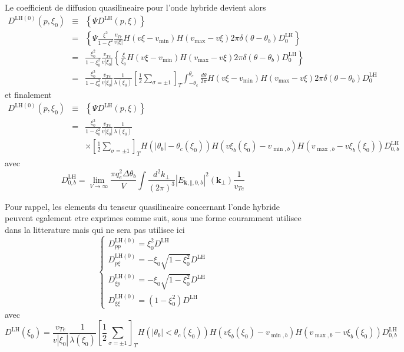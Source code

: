 Le coefficient de diffusion quasilineaire pour l'onde hybride devient
alors \begin{eqnarray*}
D^{\text{LH}(0)}(p,\xi_{0}) & \equiv & \left\{ \Psi D^{\text{LH}}(p,\xi)\right\} \\
 & = & \left\{ \Psi\frac{\xi^{2}}{1-\xi^{2}}\frac{v_{Te}}{v\left|\xi\right|}H(v\xi-v_{\min})H(v_{\max}-v\xi)2\pi\delta(\theta-\theta_{b})D_{0}^{\text{LH}}\right\} \\
 & = & \frac{\xi_{0}^{2}}{1-\xi_{0}^{2}}\frac{v_{Te}}{v\left|\xi_{0}\right|}\left\{ \frac{\xi}{\xi_{0}}H(v\xi-v_{\min})H(v_{\max}-v\xi)2\pi\delta(\theta-\theta_{b})D_{0}^{\text{LH}}\right\} \\
 & = & \frac{\xi_{0}^{2}}{1-\xi_{0}^{2}}\frac{v_{Te}}{v\left|\xi_{0}\right|}\frac{1}{\lambda\left(\xi_{0}\right)}\left[\frac{1}{2}\sum_{\sigma=\pm1}\right]_{T}\int_{-\theta_{c}}^{\theta_{c}}\frac{d\theta}{2\pi}H\left(v\xi-v_{\min}\right)H(v_{\max}-v\xi)2\pi\delta(\theta-\theta_{b})D_{0}^{\text{LH}}\end{eqnarray*}
 et finalement \begin{eqnarray*}
D^{\text{LH}(0)}(p,\xi_{0}) & \equiv & \left\{ \Psi D^{\text{LH}}(p,\xi)\right\} \\
 & = & \frac{\xi_{0}^{2}}{1-\xi_{0}^{2}}\frac{v_{Te}}{v\left|\xi_{0}\right|}\frac{1}{\lambda\left(\xi_{0}\right)}\\
 &  & \times\left[\frac{1}{2}\sum_{\sigma=\pm1}\right]_{T}H\left(|\theta_{b}|-\theta_{c}\left(\xi_{0}\right)\right)H\left(v\xi_{b}\left(\xi_{0}\right)-v_{\min,b}\right)H\left(v_{\max,b}-v\xi_{b}\left(\xi_{0}\right)\right)D_{0,b}^{\text{LH}}\end{eqnarray*}
 avec \[
D_{0,b}^{\text{LH}}=\lim_{V\rightarrow\infty}\frac{\pi q_{e}^{2}\Delta\theta_{b}}{V}\int\frac{d^{2}k_{\bot}}{(2\pi)^{3}}\left|E_{\mathbf{k},\Vert,0,b}\right|^{2}(\mathbf{k}_{\bot})\frac{1}{v_{Te}}\]


Pour rappel, les elements du tenseur quasilineaire concernant l'onde
hybride peuvent egalement etre exprimes comme suit, sous une forme
couramment utilisee dans la litterature mais qui ne sera pas utilisee
ici \[
\left\{ \begin{array}{l}
D_{pp}^{\text{LH}(0)}=\xi_{0}^{2}D^{\text{LH}}\\
D_{p\xi}^{\text{LH}(0)}=-\xi_{0}\sqrt{1-\xi_{0}^{2}}D^{\text{LH}}\\
D_{\xi p}^{\text{LH}(0)}=-\xi_{0}\sqrt{1-\xi_{0}^{2}}D^{\text{LH}}\\
D_{\xi\xi}^{\text{LH}(0)}=\left(1-\xi_{0}^{2}\right)D^{\text{LH}}\end{array}\right.\]
 avec \[
D^{\text{LH}}\left(\xi_{0}\right)=\frac{v_{Te}}{v\left|\xi_{0}\right|}\frac{1}{\lambda\left(\xi_{0}\right)}\left[\frac{1}{2}\sum_{\sigma=\pm1}\right]_{T}H(|\theta_{b}|<\theta_{c}\left(\xi_{0}\right))H(v\xi_{b}\left(\xi_{0}\right)-v_{\min,b})H(v_{\max,b}-v\xi_{b}\left(\xi_{0}\right))D_{0,b}^{\text{LH}}\]

